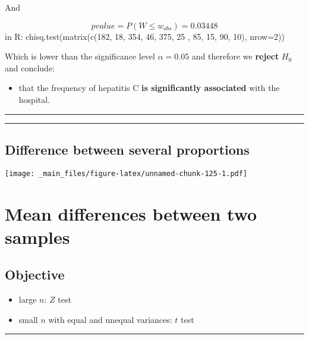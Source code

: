 \documentclass[
]{book}
\providecommand{\tightlist}{%
  \setlength{\itemsep}{0pt}\setlength{\parskip}{0pt}}
\begin{document}
And

\[pvalue=P(W \leq w_{obs}) = 0.03448\]
in R:
chisq.test(matrix(c(182, 18, 354, 46, 375, 25 , 85, 15, 90, 10), nrow=2))

Which is lower than the significance level \(\alpha=0.05\) and therefore we \textbf{reject} \(H_0\) and conclude:

\begin{itemize}
\tightlist
\item
  that the frequency of hepatitis C \textbf{is significantly associated} with the hospital.
\end{itemize}

\begin{center}\rule{0.5\linewidth}{0.5pt}\end{center}

\begin{center}\rule{0.5\linewidth}{0.5pt}\end{center}

\hypertarget{difference-between-several-proportions-3}{%
\section{Difference between several proportions}\label{difference-between-several-proportions-3}}

\texttt{[image: \_main\_files/figure-latex/unnamed-chunk-125-1.pdf]}

\hypertarget{mean-differences-between-two-samples}{%
\chapter{Mean differences between two samples}\label{mean-differences-between-two-samples}}

\hypertarget{objective-15}{%
\section{Objective}\label{objective-15}}

\begin{itemize}
\tightlist
\item
  large \(n\): \(Z\) test
\item
  small \(n\) with equal and unequal variances: \(t\) test
\end{itemize}

\begin{center}\rule{0.5\linewidth}{0.5pt}\end{center}
\end{document}
